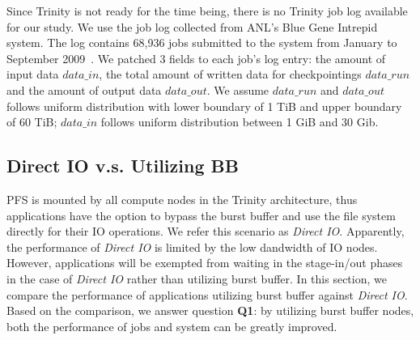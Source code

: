 Since Trinity is not ready for the time being, there is no Trinity job log available for our study.
We use the job log collected from ANL's Blue Gene Intrepid system. The log contains 68,936 jobs
submitted to the system from January to September 2009~\cite{JobTrace}.
We patched 3 fields to each job's log entry: the amount of input data $data\_in$,
the total amount of written data for checkpointings $data\_run$
and the amount of output data $data\_out$.
We assume $data\_run$ and $data\_out$ follows uniform distribution with
lower boundary of 1 TiB and upper boundary of 60 TiB;
$data\_in$ follows uniform distribution between 1 GiB and 30 Gib.



\subsection{Direct IO v.s. Utilizing BB}
\label{Sec:Sim:DirectIOvsBB}



PFS is mounted by all compute nodes in the Trinity architecture, thus applications have the
option to bypass the burst buffer and use the file system directly for their IO operations. 
We refer this scenario as \textit{Direct IO}. Apparently, the performance of \textit{Direct IO}
is limited by the low dandwidth of IO nodes. However, applications will be exempted from 
waiting in the stage-in/out phases in the case of \textit{Direct IO} rather than utilizing burst buffer.
In this section, we compare the performance of applications utilizing burst buffer
against \textit{Direct IO}.
Based on the comparison, we answer question \textbf{Q1}: by utilizing burst buffer nodes,
both the performance of jobs and system can be greatly improved. 


